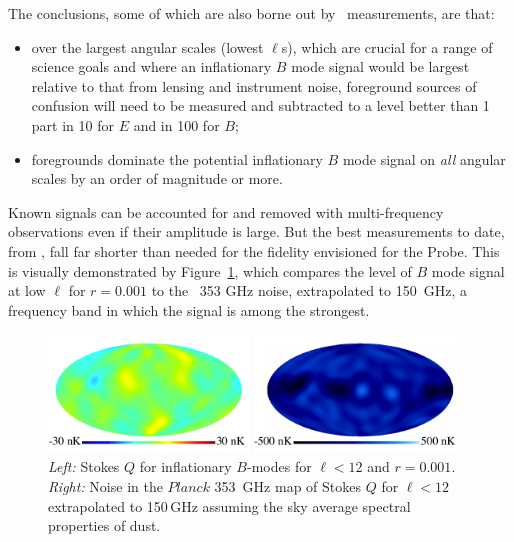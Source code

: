 \noindent The conclusions, some of which are also borne out by \planck\ measurements, are that: \\
\begin{itemize}
\item{over the largest angular scales (lowest $\ell$s), which are crucial for a range 
of science goals and where an inflationary $B$ mode 
signal would be largest relative to that from lensing and instrument noise, foreground sources of confusion will need to be measured and subtracted to a level better than 1 part in 10 for $E$ and in 100 for $B$;}
\item{foregrounds dominate the potential inflationary $B$ mode signal on {\it all} angular scales by an order of magnitude or more.}
\end{itemize}

Known signals can be accounted for and removed with multi-frequency observations even if their amplitude is large. 
But the best measurements to date, from \planck , fall far shorter than needed for the fidelity 
envisioned for the Probe. This is visually demonstrated by Figure~\ref{fig:Qrp001}, which 
compares the level of $B$ mode signal at low $\ell$ for $r = 0.001$ to the \planck\ 353 GHz noise, 
extrapolated to 150~GHz, a frequency band in which the signal is among the strongest. 
\begin{figure}[ht!]
\hspace{.05in}
\parbox{2.in}{\centerline {
\includegraphics[width=2.1in]{Figures/P15_2_12_rp001.pdf} } }
\parbox{2.1in}{\centerline { 
\includegraphics[width=2.1in]{Figures/P353_N_2_12.pdf} } }
\hspace{0.in}
\parbox{2.2in} { 
\caption{ \footnotesize \setlength{\baselineskip}{0.95\baselineskip}
{\it Left:} Stokes $Q$ for inflationary $B$-modes for $\ell<12$ and $r=0.001$. 
 {\it Right:} Noise in the $Planck$ 353~GHz map of Stokes $Q$ for $\ell<12$ 
 extrapolated to 150\,GHz assuming the sky average spectral properties of dust. 
\label{fig:Qrp001}  }  }
\vspace{-0.05in}
\end{figure}

